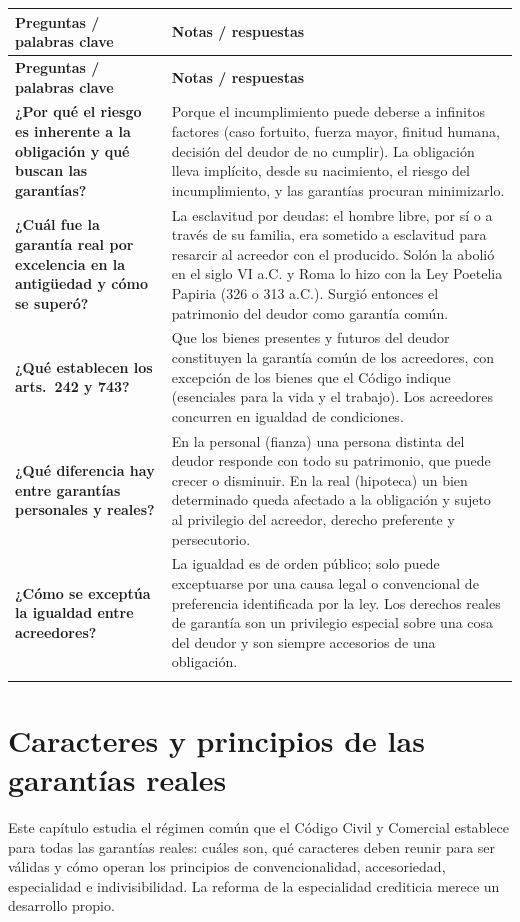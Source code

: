 \documentclass[12pt,oneside]{book}
\makeatletter
\renewcommand{\arraystretch}{1.25}
\newcommand{\cq}[2]{\textbf{#1} & #2 \\[0.45em]}
\newcommand{\cornell}[3]{%
\par\bigskip\noindent{\large\bfseries Cuadro Cornell: #1}\par\nopagebreak\smallskip
\begingroup
\small
\renewcommand{\arraystretch}{1.15}
\begin{longtable}{@{}>{\raggedright\arraybackslash}p{0.26\textwidth}>{\raggedright\arraybackslash}p{0.66\textwidth}@{}}
\toprule
\textbf{Preguntas / palabras clave} & \textbf{Notas / respuestas} \\
\midrule
\endfirsthead
\toprule
\textbf{Preguntas / palabras clave} & \textbf{Notas / respuestas} \\
\midrule
\endhead
#2
\midrule
\multicolumn{2}{@{}p{\dimexpr0.92\textwidth+2\tabcolsep\relax}@{}}{\vspace{0.2em}\textbf{Resumen.} #3\vspace{0.2em}} \\
\bottomrule
\end{longtable}
\endgroup
}
\makeatother
\begin{document}
\cornell{fundamentos de las garantías}{
\cq{¿Por qué el riesgo es inherente a la obligación y qué buscan las garantías?}{Porque el incumplimiento puede deberse a infinitos factores (caso fortuito, fuerza mayor, finitud humana, decisión del deudor de no cumplir). La obligación lleva implícito, desde su nacimiento, el riesgo del incumplimiento, y las garantías procuran minimizarlo.}
\cq{¿Cuál fue la garantía real por excelencia en la antigüedad y cómo se superó?}{La esclavitud por deudas: el hombre libre, por sí o a través de su familia, era sometido a esclavitud para resarcir al acreedor con el producido. Solón la abolió en el siglo VI a.C. y Roma lo hizo con la Ley Poetelia Papiria (326 o 313 a.C.). Surgió entonces el patrimonio del deudor como garantía común.}
\cq{¿Qué establecen los arts.~242 y 743?}{Que los bienes presentes y futuros del deudor constituyen la garantía común de los acreedores, con excepción de los bienes que el Código indique (esenciales para la vida y el trabajo). Los acreedores concurren en igualdad de condiciones.}
\cq{¿Qué diferencia hay entre garantías personales y reales?}{En la personal (fianza) una persona distinta del deudor responde con todo su patrimonio, que puede crecer o disminuir. En la real (hipoteca) un bien determinado queda afectado a la obligación y sujeto al privilegio del acreedor, derecho preferente y persecutorio.}
\cq{¿Cómo se exceptúa la igualdad entre acreedores?}{La igualdad es de orden público; solo puede exceptuarse por una causa legal o convencional de preferencia identificada por la ley. Los derechos reales de garantía son un privilegio especial sobre una cosa del deudor y son siempre accesorios de una obligación.}
}{Las garantías buscan minimizar el riesgo de incumplimiento inherente a toda obligación. Tras la abolición de la esclavitud por deudas, el patrimonio del deudor pasó a ser la garantía común de los acreedores (arts.~242 y 743), con igualdad entre ellos como regla de orden público. Los derechos reales de garantía son accesorios y otorgan un privilegio especial sobre una cosa determinada, a diferencia de las garantías personales.}

\chapter{Caracteres y principios de las garantías reales}\label{cap:garantias-carac}

Este capítulo estudia el régimen común que el Código Civil y Comercial establece para todas las garantías reales: cuáles son, qué caracteres deben reunir para ser válidas y cómo operan los principios de convencionalidad, accesoriedad, especialidad e indivisibilidad. La reforma de la especialidad crediticia merece un desarrollo propio.
\end{document}
